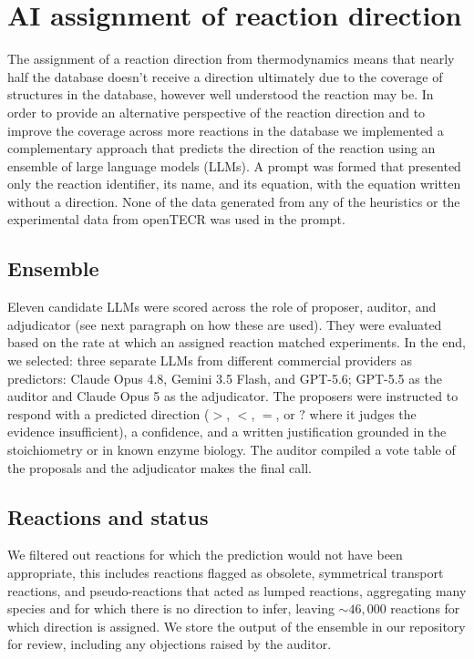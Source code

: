 \section{AI assignment of reaction direction}\label{sec:s4}

The assignment of a reaction direction from thermodynamics means that nearly half the database doesn't receive a direction ultimately due to the coverage of structures in the database, however well understood the reaction may be. In order to provide an alternative perspective of the reaction direction and to improve the coverage across more reactions in the database we implemented a complementary approach that predicts the direction of the reaction using an ensemble of large language models (LLMs). A prompt was formed that presented only the reaction identifier, its name, and its equation, with the equation written without a direction. None of the data generated from any of the heuristics or the experimental data from openTECR was used in the prompt.

\subsection{Ensemble} Eleven candidate LLMs were scored across the role of proposer, auditor, and adjudicator (see next paragraph on how these are used). They were evaluated based on the rate at which an assigned reaction matched experiments. In the end, we selected: three separate LLMs from different commercial providers as predictors: Claude Opus 4.8, Gemini 3.5 Flash, and GPT-5.6; GPT-5.5 as the auditor and Claude Opus 5 as the adjudicator. The proposers were instructed to respond with a predicted direction ($>$, $<$, $=$, or $?$ where it judges the evidence insufficient), a confidence, and a written justification grounded in the stoichiometry or in known enzyme biology. The auditor compiled a vote table of the proposals and the adjudicator makes the final call.

\subsection{Reactions and status} We filtered out reactions for which the prediction would not have been appropriate, this includes reactions flagged as obsolete, symmetrical transport reactions, and pseudo-reactions that acted as lumped reactions, aggregating many species and for which there is no direction to infer, leaving $\sim46,000$ reactions for which direction is assigned. We store the output of the ensemble in our repository for review, including any objections raised by the auditor.

